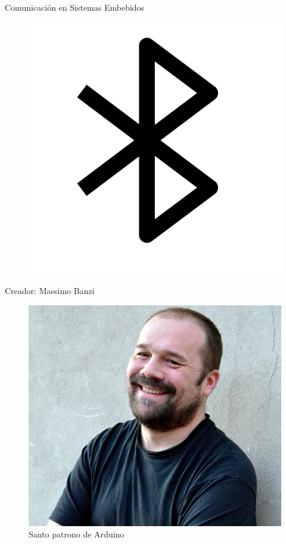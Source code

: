 \documentclass{beamer}
\begin{document}
\begin{frame}{Comunicación en Sistemas Embebidos}
\begin{multicols}{3}
\begin{figure}
				\includegraphics[scale=5.4]{bluetooth}
			\end{figure}
		\end{multicols}
	\end{frame}
	
	\begin{frame}{Creador: Massimo Banzi}
		\begin{figure}
			\centering
			\includegraphics[scale=0.25]{banzi}
			\caption{Santo patrono de Arduino}
		\end{figure}
	\end{frame}
	
\end{document}
